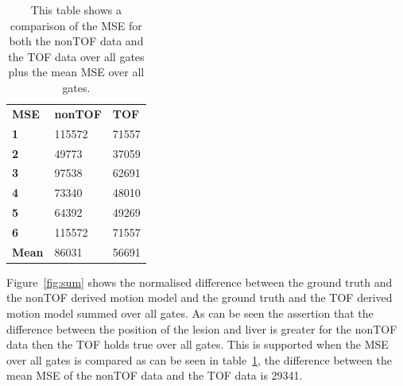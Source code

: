 \documentclass[9pt]{IEEEtran}
\begin{document}
\begin{table}
    \centering
    \begin{tabular}{lll}
        \textbf{MSE}  & \textbf{nonTOF} & \textbf{TOF} \\
        \textbf{1}    & 115572          & 71557        \\
        \textbf{2}    & 49773           & 37059        \\
        \textbf{3}    & 97538           & 62691        \\
        \textbf{4}    & 73340           & 48010        \\
        \textbf{5}    & 64392           & 49269        \\
        \textbf{6}    & 115572          & 71557        \\
        \textbf{Mean} & 86031           & 56691       
    \end{tabular}
    \caption{This table shows a comparison of the MSE for both the nonTOF data and the TOF data over all gates plus the mean MSE over all gates.}
    \label{tab:mse}
\end{table}

Figure~\ref{fig:sum} shows the normalised difference between the ground truth and the nonTOF derived motion model and the ground truth and the TOF derived motion model summed over all gates. As can be seen the assertion that the difference between the position of the lesion and liver is greater for the nonTOF data then the TOF holds true over all gates. This is supported when the MSE over all gates is compared as can be seen in table~\ref{tab:mse}, the difference between the mean MSE of the nonTOF data and the TOF data is 29341.


%
%
\end{document}
